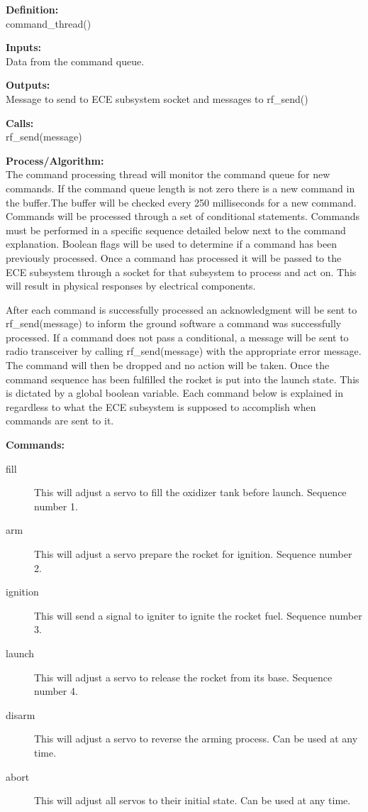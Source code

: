 \documentclass[10pt,draftclsnofoot,onecolumn,compsoc]{IEEEtran}
\begin{document}
{\bf Definition:} \\ 
command\_thread() \par
{\bf Inputs:} \\  Data from the command queue. \par
{\bf Outputs:} \\  Message to send to ECE subsystem socket and messages to rf\_send() \par
{\bf Calls:} \\ 
rf\_send(message)  \par
{\bf Process/Algorithm:} \\
The command processing thread will monitor the command queue for new commands. If the command queue length is not zero there is a new command in the buffer.The buffer will be checked  every 250 milliseconds for a new command. Commands will be processed through a set of conditional statements. Commands must be performed in a specific sequence detailed below next to the command explanation. Boolean flags will be used to determine if a command has been previously processed.  Once a command has processed it will be passed to the ECE subsystem through a socket for that subsystem to process and act on. This will result in physical responses by electrical components. \par
 After each command is successfully processed an acknowledgment will be sent to rf\_send(message) to inform the ground software a command was successfully processed. If a command does not pass a conditional, a message will be sent to radio transceiver by calling rf\_send(message) with the appropriate error message. The command will then be dropped and no action will be taken. Once the command sequence has been fulfilled the rocket is put into the launch state. This is dictated by a global boolean variable. Each command below is explained in regardless to what the ECE subsystem is supposed to accomplish when commands are sent to it.\par
{\bf Commands:} \\
\begin{description}
	\item[fill] This will adjust a servo to fill the oxidizer tank before launch. Sequence number 1.
	\item[arm] This will adjust a servo prepare the rocket for ignition. Sequence number 2.
	\item[ignition] This will send a signal to igniter to ignite the rocket fuel. Sequence number 3.
	\item[launch] This will adjust a servo to release the rocket from its base. Sequence number 4.
	\item[disarm] This will adjust a servo to reverse the arming process. Can be used at any time.
	\item[abort] This will adjust all servos to their initial state. Can be used at any time.
\end{description}
\end{document}
